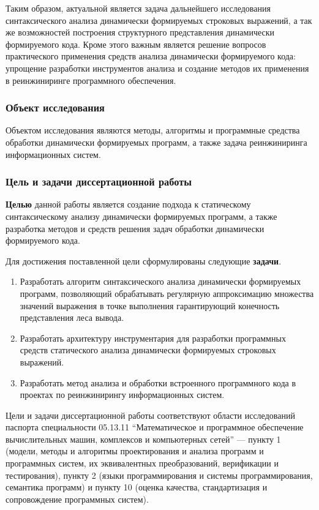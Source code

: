 Таким образом, актуальной является задача дальнейшего исследования синтаксического анализа динамически формируемых строковых выражений, а так же возможностей построения структурного представления динамически формируемого кода. Кроме этого важным является решение вопросов практического применения средств анализа динамически формируемого кода: упрощение разработки инструментов анализа и создание методов их применения в реинжиниринге программного обеспечения.

\subsubsection*{\large{Объект исследования}}

 Объектом исследования являются методы, алгоритмы и программные средства обработки динамически формируемых программ, а также задача реинжиниринга информационных систем.

\subsubsection*{\large{Цель и задачи диссертационной работы}}

\textbf{Целью} данной работы является создание подхода к статическому синтаксическому анализу динамически формируемых программ, а также разработка методов и средств решения задач обработки динамически формируемого кода.

Для достижения поставленной цели сформулированы следующие \textbf{задачи}.
\begin{enumerate}
    \item Разработать алгоритм синтаксического анализа динамически формируемых программ, позволяющий обрабатывать регулярную аппроксимацию множества значений выражения в точке выполнения гарантирующий конечность представления леса вывода.
    \item Разработать архитектуру инструментария для разработки программных средств статического анализа динамически формируемых строковых выражений.
    \item Разработать метод анализа и обработки встроенного программного кода в проектах по реинжинирингу информационных систем.
\end{enumerate}

Цели и задачи диссертационной работы соответствуют области исследований паспорта специальности 05.13.11 ``Математическое и программное обеспечение вычислительных машин, комплексов и компьютерных сетей'' --- пункту 
1 (модели, методы и алгоритмы проектирования и анализа программ и программных систем, их эквивалентных преобразований, верификации и тестирования),
пункту 2 (языки программирования и системы программирования, семантика программ) и пункту 10 (оценка качества, стандартизация и сопровождение программных систем).

